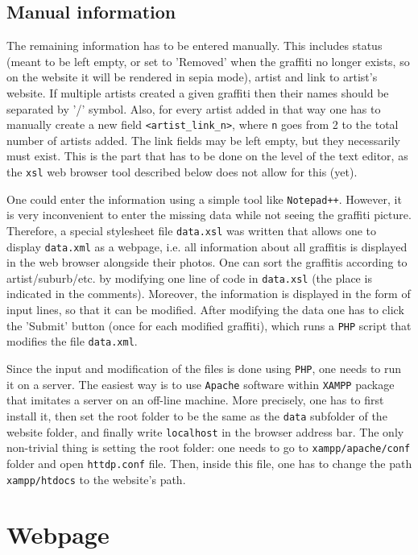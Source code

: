 \documentclass[pra,aps,onecolumn,letter,nopacs,nofootinbib,longbibliography,notitlepage]{revtex4-1}
\theoremstyle{plain}
\theoremstyle{definition}
\begin{document}
\subsection{Manual information}

The remaining information has to be entered manually. This includes status (meant to be left empty, or set to 'Removed' when the graffiti no longer exists, so on the website it will be rendered in sepia mode), artist and link to artist's website. If multiple artists created a given graffiti then their names should be separated by '/' symbol. Also, for every artist added in that way one has to manually create a new field \texttt{<artist\_link\_n>}, where \texttt{n} goes from 2 to the total number of artists added. The link fields may be left empty, but they necessarily must exist. This is the part that has to be done on the level of the text editor, as the \texttt{xsl} web browser tool described below does not allow for this (yet).

One could enter the information using a simple tool like \texttt{Notepad++}. However, it is very inconvenient to enter the missing data while not seeing the graffiti picture. Therefore, a special stylesheet file \texttt{data.xsl} was written that allows one to display \texttt{data.xml} as a webpage, i.e. all information about all graffitis is displayed in the web browser alongside their photos. One can sort the graffitis according to artist/suburb/etc. by modifying one line of code in \texttt{data.xsl} (the place is indicated in the comments). Moreover, the information is displayed in the form of input lines, so that it can be modified. After modifying the data one has to click the 'Submit' button (once for each modified graffiti), which runs a \texttt{PHP} script that modifies the file \texttt{data.xml}. 

Since the input and modification of the files is done using \texttt{PHP}, one needs to run it on a server. The easiest way is to use \texttt{Apache} software within \texttt{XAMPP} package that imitates a server on an off-line machine. More precisely, one has to first install it, then set the root folder to be the same as the \texttt{data} subfolder of the website folder, and finally write \texttt{localhost} in the browser address bar. The only non-trivial thing is setting the root folder: one needs to go to \texttt{xampp/apache/conf} folder and open \texttt{httdp.conf} file. Then, inside this file, one has to change the path \texttt{xampp/htdocs} to the website's path.

	
\section{Webpage}
\end{document}
